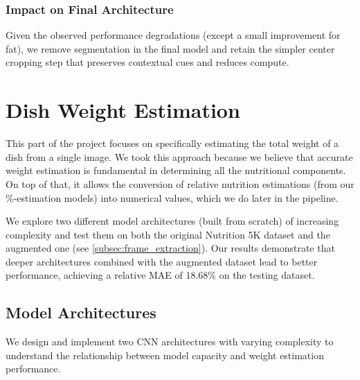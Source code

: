 \documentclass[a4paper]{article}
\begin{document}
        \subsubsection{Impact on Final Architecture}
        Given the observed performance degradations (except a small improvement for fat), we remove segmentation in the final model and retain the simpler center cropping step that preserves contextual cues and reduces compute.
        
        
        
        
        
        \clearpage
                
        \section{Dish Weight Estimation}
        This part of the project focuses on specifically estimating the total weight of a dish from a single image. We took this approach because we believe that accurate weight estimation is fundamental in determining all the nutritional components. On top of that, it allows the conversion of relative nutrition estimations (from our \%-estimation models) into numerical values, which we do later in the pipeline. 
        
        We explore two different model architectures (built from scratch) of increasing complexity and test them on both the original Nutrition 5K dataset and the augmented one (see \autoref{subsec:frame_extraction}). Our results demonstrate that deeper architectures combined with the augmented dataset lead to better performance, achieving a relative MAE of 18.68\% on the testing dataset.

        \subsection{Model Architectures}
        We design and implement two CNN architectures with varying complexity to understand the relationship between model capacity and weight estimation performance. \\
\end{document}
